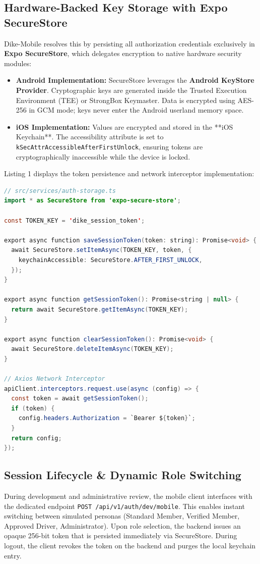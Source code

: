 \documentclass[conference,10pt,a4paper]{IEEEtran}
\begin{document}
\subsection{Hardware-Backed Key Storage with Expo SecureStore}
Dike-Mobile resolves this by persisting all authorization credentials exclusively in \textbf{Expo SecureStore}, which delegates encryption to native hardware security modules:
\begin{itemize}
    \item \textbf{Android Implementation:} SecureStore leverages the \textbf{Android KeyStore Provider}. Cryptographic keys are generated inside the Trusted Execution Environment (TEE) or StrongBox Keymaster. Data is encrypted using AES-256 in GCM mode; keys never enter the Android userland memory space.
    \item \textbf{iOS Implementation:} Values are encrypted and stored in the **iOS Keychain**. The accessibility attribute is set to \texttt{kSecAttrAccessibleAfterFirstUnlock}, ensuring tokens are cryptographically inaccessible while the device is locked.
\end{itemize}

Listing 1 displays the token persistence and network interceptor implementation:
\begin{lstlisting}[language=Java,caption={Hardware-Backed Token Persistence and Network Interceptor}]
// src/services/auth-storage.ts
import * as SecureStore from 'expo-secure-store';

const TOKEN_KEY = 'dike_session_token';

export async function saveSessionToken(token: string): Promise<void> {
  await SecureStore.setItemAsync(TOKEN_KEY, token, {
    keychainAccessible: SecureStore.AFTER_FIRST_UNLOCK,
  });
}

export async function getSessionToken(): Promise<string | null> {
  return await SecureStore.getItemAsync(TOKEN_KEY);
}

export async function clearSessionToken(): Promise<void> {
  await SecureStore.deleteItemAsync(TOKEN_KEY);
}

// Axios Network Interceptor
apiClient.interceptors.request.use(async (config) => {
  const token = await getSessionToken();
  if (token) {
    config.headers.Authorization = `Bearer ${token}`;
  }
  return config;
});
\end{lstlisting}

\subsection{Session Lifecycle \& Dynamic Role Switching}
During development and administrative review, the mobile client interfaces with the dedicated endpoint \texttt{POST /api/v1/auth/dev/mobile}. This enables instant switching between simulated personas (Standard Member, Verified Member, Approved Driver, Administrator). Upon role selection, the backend issues an opaque 256-bit token that is persisted immediately via SecureStore. During logout, the client revokes the token on the backend and purges the local keychain entry.
\end{document}

